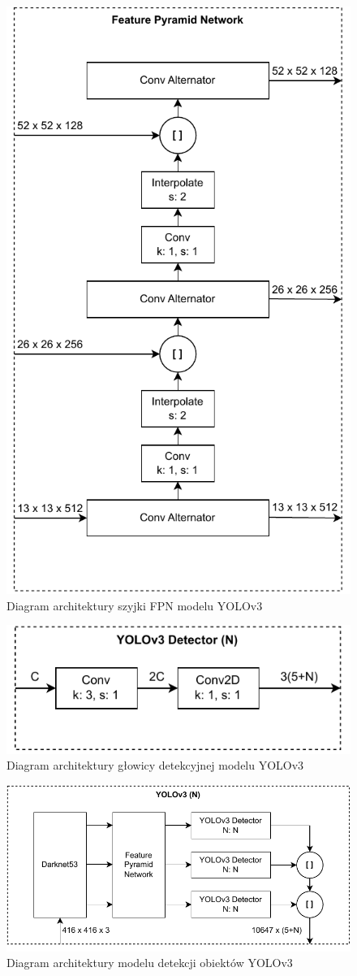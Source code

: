\documentclass{article}
\begin{document}
\begin{figure}[!h]
    \centering \includegraphics[width=0.55\linewidth]{fpn}
    \caption{Diagram architektury szyjki FPN modelu YOLOv3}
    \label{fig:fpn}
\end{figure}

\begin{figure}[!h]
    \centering \includegraphics[width=0.45\linewidth]{detector}
    \caption{Diagram architektury głowicy detekcyjnej modelu YOLOv3}
    \label{fig:detector}
\end{figure}

\begin{figure}[!h]
    \centering \includegraphics[width=0.65\linewidth]{yolov3}
    \caption{Diagram architektury modelu detekcji obiektów YOLOv3}
    \label{fig:yolov3}
\end{figure}
\end{document}
